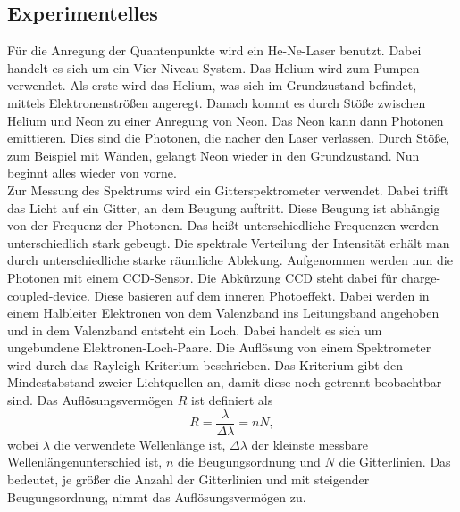 \subsection{Experimentelles}
Für die Anregung der Quantenpunkte wird ein He-Ne-Laser benutzt. Dabei handelt es sich um ein Vier-Niveau-System. 
Das Helium wird zum Pumpen verwendet. 
Als erste wird das Helium, was sich im Grundzustand befindet, mittels Elektronenströ{\ss}en angeregt. 
Danach kommt es durch Stö{\ss}e zwischen Helium und Neon zu einer Anregung von Neon. 
Das Neon kann dann Photonen emittieren. 
Dies sind die Photonen, die nacher den Laser verlassen. 
Durch Stö{\ss}e, zum Beispiel mit Wänden, gelangt Neon wieder in den Grundzustand. 
Nun beginnt alles wieder von vorne. \\
Zur Messung des Spektrums wird ein Gitterspektrometer verwendet. Dabei trifft das Licht auf ein Gitter, an dem Beugung auftritt. Diese Beugung ist abhängig von der Frequenz der Photonen. 
Das hei{\ss}t unterschiedliche Frequenzen werden unterschiedlich stark gebeugt. 
Die spektrale Verteilung der Intensität erhält man durch unterschiedliche starke räumliche Ablekung.
Aufgenommen werden nun die Photonen mit einem CCD-Sensor. 
Die Abkürzung CCD steht dabei für charge-coupled-device. 
Diese basieren auf dem inneren Photoeffekt. 
Dabei werden in einem Halbleiter Elektronen von dem Valenzband ins Leitungsband angehoben und in dem Valenzband entsteht ein Loch. 
Dabei handelt es sich um ungebundene Elektronen-Loch-Paare. 
Die Auflösung von einem Spektrometer wird durch das Rayleigh-Kriterium beschrieben. 
Das Kriterium gibt den Mindestabstand zweier Lichtquellen an, damit diese noch getrennt beobachtbar sind. Das Auflösungsvermögen $R$ ist definiert als 
\begin{equation}
R = \frac{\lambda}{\Delta \lambda} = n N,
\label{eq:Auflösung}
\end{equation}
wobei $\lambda$ die verwendete Wellenlänge ist, $\Delta \lambda$ der kleinste messbare Wellenlängenunterschied ist, $n$ die Beugungsordnung und $N$ die Gitterlinien. 
Das bedeutet, je grö{\ss}er die Anzahl der Gitterlinien und mit steigender Beugungsordnung, nimmt das Auflösungsvermögen zu. 









